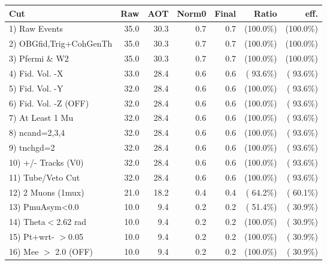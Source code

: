  \begin{table}[h!]\centering
 \begin{tabular}{||l||r|r|r|r|r|r||}
 \hline
 \hline
 Cut & Raw & AOT & Norm0 & Final & Ratio & eff.       \\
 \hline
  1) Raw Events           &         35.0 &         30.3 &          0.7 &          0.7 & (100.0\%) & (100.0\%) \\
  2) OBGfid,Trig+CohGenTh &         35.0 &         30.3 &          0.7 &          0.7 & (100.0\%) & (100.0\%) \\
  3) Pfermi \& W2         &         35.0 &         30.3 &          0.7 &          0.7 & (100.0\%) & (100.0\%) \\
  4) Fid. Vol. -X         &         33.0 &         28.4 &          0.6 &          0.6 & ( 93.6\%) & ( 93.6\%) \\
  5) Fid. Vol. -Y         &         32.0 &         28.4 &          0.6 &          0.6 & (100.0\%) & ( 93.6\%) \\
  6) Fid. Vol. -Z (OFF)   &         32.0 &         28.4 &          0.6 &          0.6 & (100.0\%) & ( 93.6\%) \\
  7) At Least 1 Mu        &         32.0 &         28.4 &          0.6 &          0.6 & (100.0\%) & ( 93.6\%) \\
  8) ncand=2,3,4          &         32.0 &         28.4 &          0.6 &          0.6 & (100.0\%) & ( 93.6\%) \\
  9) tnchgd=2             &         32.0 &         28.4 &          0.6 &          0.6 & (100.0\%) & ( 93.6\%) \\
 10) +/- Tracks (V0)      &         32.0 &         28.4 &          0.6 &          0.6 & (100.0\%) & ( 93.6\%) \\
 11) Tube/Veto Cut        &         32.0 &         28.4 &          0.6 &          0.6 & (100.0\%) & ( 93.6\%) \\
 12) 2 Muons (1mux)       &         21.0 &         18.2 &          0.4 &          0.4 & ( 64.2\%) & ( 60.1\%) \\
 13) PmuAsym<0.0          &         10.0 &          9.4 &          0.2 &          0.2 & ( 51.4\%) & ( 30.9\%) \\
 14) Theta$<$2.62 rad     &         10.0 &          9.4 &          0.2 &          0.2 & (100.0\%) & ( 30.9\%) \\
 15) Pt+wrt- $>$0.05      &         10.0 &          9.4 &          0.2 &          0.2 & (100.0\%) & ( 30.9\%) \\
 16) Mee $>$ 2.0  (OFF)   &         10.0 &          9.4 &          0.2 &          0.2 & (100.0\%) & ( 30.9\%) \\

\end{tabular}
\end{table}
